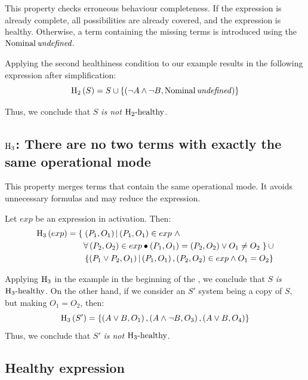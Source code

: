 This property checks erroneous behaviour completeness. 
If the expression is already complete, all possibilities are already covered, and the expression is healthy.
Otherwise, a term containing the missing terms is introduced using the $\mathop{\mathrm{Nominal}} \mathit{undefined}.$

Applying the second healthiness condition to our example results in the following expression after simplification:
\[\healthinessfun[2]{S} = S \cup \left\{\left(\lnot A \land \lnot B, \Nominal{\undefinednominal}\right)\right\}\]

Thus, we conclude that $S$ \emph{is not} $\healthy[2]$.

\subsection[H3: There are no two terms with exactly the same operational mode.]{$\healthiness[3]$: There are no two terms with exactly the same operational mode}
\label{sec:h3}
This property merges terms that contain the same operational mode.
It avoids unnecessary formulas and may reduce the expression.

\begin{definition}
Let $exp$ be an expression in \ac{activation}. Then:
%
\begin{equation}
\label{eq:h3}
\begin{split}
\healthinessfun[3]{exp} = \left\{ \right.&\left(P_1, O_1\right) | \left(P_1, O_1\right) \in exp ~\land \\
    &\forall \left(P_2,O_2\right) \in exp \bullet 
      \left(P_1, O_1\right) = \left(P_2, O_2\right) \lor O_1 \neq O_2
  \left.\right\} \cup \\
  & \left\{ \left(P_1 \lor P_2, O_1\right) | \left(P_1, O_1\right),\left(P_2, O_2\right) \in exp \land O_1 = O_2 \right\}
\end{split}
\end{equation}
\end{definition}

Applying $\healthiness[3]$ in the example in the beginning of the , we conclude that $S$ \emph{is} $\healthy[3]$.
On the other hand, if we consider an $S'$ system being a copy of $S$, but making $O_1 = O_2$, then:
\[
\healthinessfun[3]{S'} = \left\{ 
  \left(A \lor B, O_1\right),
  \left(A \land \lnot B, O_3\right),
  \left(A \lor B, O_4\right)
\right\}
\]
Thus, we conclude that $S'$ \emph{is not} $\healthy[3]$.

\subsection{Healthy expression}
\label{sec:h}

